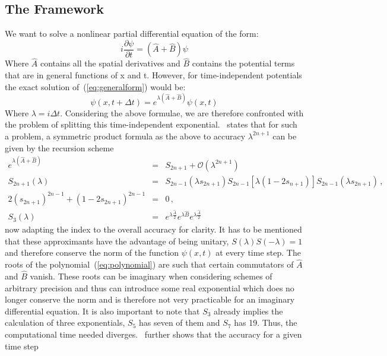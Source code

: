 \subsection{The Framework}
We want to solve a nonlinear partial differential equation of the form:
\begin{equation}\label{eq:generalform}
	i\frac{\partial \psi}{\partial t}=(\hat{A}+\hat{B})\psi
\end{equation}
Where $\hat{A}$ contains all the spatial derivatives and $\hat{B}$ contains the potential terms that are in general functions of x and t. However, 
for time-independent potentials the exact solution of~(\ref{eq:generalform}) would be:
\begin{equation}\label{eq:exactsol}
	\psi(x, t+\Delta t)=e^{\lambda(\hat{A}+\hat{B})}\psi(x, t)
\end{equation}
Where $\lambda=i\Delta t$. Considering the above formulae, we are therefore confronted with the problem of splitting this
time-independent exponential.~\cite{bandraukshen3} states that for such a problem, a symmetric product formula as the above
to accuracy $\lambda^{2n+1}$ can be given by the recursion scheme
\begin{eqnarray}
	e^{\lambda(\hat{A}+\hat{B})}&=&S_{2n+1}+\mathcal{O}(\lambda^{2n+1})\label{eq:recscheme}\\
	S_{2n+1}(\lambda)&=&S_{2n-1}(\lambda s_{2n+1})S_{2n-1}\left[\lambda(1-2s_{n+1})\right]S_{2n-1}(\lambda s_{2n+1})\,
	,\nonumber\\
	2(s_{2n+1})^{2n-1}+(1-2s_{2n+1})^{2n-1}&=&0\, ,\label{eq:polynomial}\\
	S_3(\lambda)&=&e^{\lambda\frac{\hat{A}}{2}}e^{\lambda\hat{B}}e^{\lambda\frac{\hat{A}}{2}}\label{eq:s3}\nonumber
\end{eqnarray}
now adapting the index to the overall accuracy for clarity. It has to be mentioned that these approximants have the advantage of
being unitary, $S(\lambda)S(-\lambda)=1$ and therefore conserve the norm of the function $\psi(x, t)$ at every time step. The
roots of the polynomial~(\ref{eq:polynomial}) are such that certain commutators of $\hat{A}$ and $\hat{B}$ vanish. These roots can
be imaginary when considering schemes of arbitrary precision and thus can introduce some real exponential which does no longer
conserve the norm and is therefore not very practicable for an imaginary differential equation.
It is also important to note that $S_3$ already implies the calculation of three exponentials, $S_5$ has seven of them and $S_7$
has 19. Thus, the computational time needed diverges.~\cite{bandraukshen3} further shows that the accuracy for a given time step
